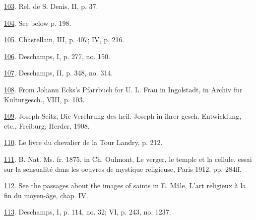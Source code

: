 \protect\hypertarget{23_NOTES.xhtmlux5cux23id_1067}{\protect\hyperlink{13_Chapter_Six__THE_DEPICTION_OF_TH.xhtmlux5cux23id_1066}{103}}.
Rel. de S. Denis, II, p. 37.

\protect\hypertarget{23_NOTES.xhtmlux5cux23id_1065}{\protect\hyperlink{13_Chapter_Six__THE_DEPICTION_OF_TH.xhtmlux5cux23id_1064}{104}}.
See below p. 198.

\protect\hypertarget{23_NOTES.xhtmlux5cux23id_1063}{\protect\hyperlink{13_Chapter_Six__THE_DEPICTION_OF_TH.xhtmlux5cux23id_1062}{105}}.
Chastellain, III, p. 407; IV, p. 216.

\protect\hypertarget{23_NOTES.xhtmlux5cux23id_1061}{\protect\hyperlink{13_Chapter_Six__THE_DEPICTION_OF_TH.xhtmlux5cux23id_1060}{106}}.
Deschamps, I, p. 277, no. 150.

\protect\hypertarget{23_NOTES.xhtmlux5cux23id_1059}{\protect\hyperlink{13_Chapter_Six__THE_DEPICTION_OF_TH.xhtmlux5cux23id_1058}{107}}.
Deschamps, II, p. 348, no. 314.

\protect\hypertarget{23_NOTES.xhtmlux5cux23page_420}{\protect\hyperlink{13_Chapter_Six__THE_DEPICTION_OF_TH.xhtmlux5cux23id_1057}{108}}.
From Johann Ecks's Pfarrbuch for U. L. Frau in Ingolstadt, in Archiv fur
Kulturgesch., VIII, p. 103.

\protect\hypertarget{23_NOTES.xhtmlux5cux23id_1056}{\protect\hyperlink{13_Chapter_Six__THE_DEPICTION_OF_TH.xhtmlux5cux23id_1055}{109}}.
Joseph Seitz, Die Verehrung des heil. Joseph in ihrer gesch.
Entwicklung, etc., Freiburg, Herder, 1908.

\protect\hypertarget{23_NOTES.xhtmlux5cux23id_1054}{\protect\hyperlink{13_Chapter_Six__THE_DEPICTION_OF_TH.xhtmlux5cux23id_1053}{110}}.
Le livre du chevalier de la Tour Landry, p. 212.

\protect\hypertarget{23_NOTES.xhtmlux5cux23id_1052}{\protect\hyperlink{13_Chapter_Six__THE_DEPICTION_OF_TH.xhtmlux5cux23id_1051}{111}}.
B. Nat. Ms. fr. 1875, in Ch. Oulmont, Le verger, le temple et la
cellule, essai sur la sensualité dans les oeuvres de mystique
religieuse, Paris 1912, pp. 284ff.

\protect\hypertarget{23_NOTES.xhtmlux5cux23id_1050}{\protect\hyperlink{13_Chapter_Six__THE_DEPICTION_OF_TH.xhtmlux5cux23id_1049}{112}}.
See the passages about the images of saints in E. Mâle, L'art religieux
à la fin du moyen-âge, chap. IV.

\protect\hypertarget{23_NOTES.xhtmlux5cux23id_1048}{\protect\hyperlink{13_Chapter_Six__THE_DEPICTION_OF_TH.xhtmlux5cux23id_1047}{113}}.
Deschamps, I, p. 114, no. 32; VI, p. 243, no. 1237.

